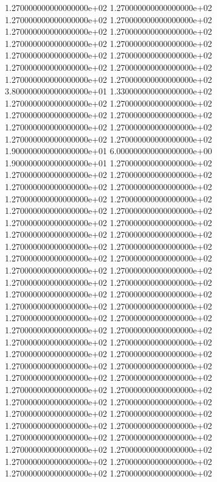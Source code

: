 1.270000000000000000e+02 1.270000000000000000e+02 1.270000000000000000e+02 1.270000000000000000e+02 1.270000000000000000e+02 1.270000000000000000e+02 1.270000000000000000e+02 1.270000000000000000e+02 1.270000000000000000e+02 1.270000000000000000e+02 1.270000000000000000e+02 1.270000000000000000e+02 1.270000000000000000e+02 1.270000000000000000e+02 3.800000000000000000e+01 1.330000000000000000e+02 1.270000000000000000e+02 1.270000000000000000e+02 1.270000000000000000e+02 1.270000000000000000e+02 1.270000000000000000e+02 1.270000000000000000e+02 1.270000000000000000e+02 1.270000000000000000e+02 1.900000000000000000e+01 6.000000000000000000e+00 1.900000000000000000e+01 1.270000000000000000e+02 1.270000000000000000e+02 1.270000000000000000e+02 1.270000000000000000e+02 1.270000000000000000e+02 1.270000000000000000e+02 1.270000000000000000e+02 1.270000000000000000e+02 1.270000000000000000e+02 1.270000000000000000e+02 1.270000000000000000e+02 1.270000000000000000e+02 1.270000000000000000e+02 1.270000000000000000e+02 1.270000000000000000e+02 1.270000000000000000e+02 1.270000000000000000e+02 1.270000000000000000e+02 1.270000000000000000e+02 1.270000000000000000e+02 1.270000000000000000e+02 1.270000000000000000e+02 1.270000000000000000e+02 1.270000000000000000e+02 1.270000000000000000e+02 1.270000000000000000e+02 1.270000000000000000e+02 1.270000000000000000e+02 1.270000000000000000e+02 1.270000000000000000e+02 1.270000000000000000e+02 1.270000000000000000e+02 1.270000000000000000e+02 1.270000000000000000e+02 1.270000000000000000e+02 1.270000000000000000e+02 1.270000000000000000e+02 1.270000000000000000e+02 1.270000000000000000e+02 1.270000000000000000e+02 1.270000000000000000e+02 1.270000000000000000e+02 1.270000000000000000e+02 1.270000000000000000e+02 1.270000000000000000e+02 1.270000000000000000e+02 1.270000000000000000e+02 1.270000000000000000e+02 1.270000000000000000e+02 1.270000000000000000e+02 1.270000000000000000e+02 1.270000000000000000e+02 1.270000000000000000e+02
